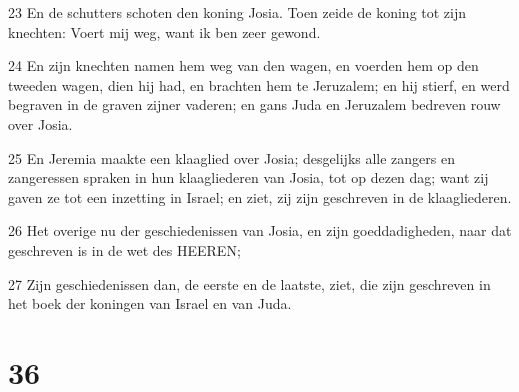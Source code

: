 \par 23 En de schutters schoten den koning Josia. Toen zeide de koning tot zijn knechten: Voert mij weg, want ik ben zeer gewond.
\par 24 En zijn knechten namen hem weg van den wagen, en voerden hem op den tweeden wagen, dien hij had, en brachten hem te Jeruzalem; en hij stierf, en werd begraven in de graven zijner vaderen; en gans Juda en Jeruzalem bedreven rouw over Josia.
\par 25 En Jeremia maakte een klaaglied over Josia; desgelijks alle zangers en zangeressen spraken in hun klaagliederen van Josia, tot op dezen dag; want zij gaven ze tot een inzetting in Israel; en ziet, zij zijn geschreven in de klaagliederen.
\par 26 Het overige nu der geschiedenissen van Josia, en zijn goeddadigheden, naar dat geschreven is in de wet des HEEREN;
\par 27 Zijn geschiedenissen dan, de eerste en de laatste, ziet, die zijn geschreven in het boek der koningen van Israel en van Juda.

\chapter{36}

